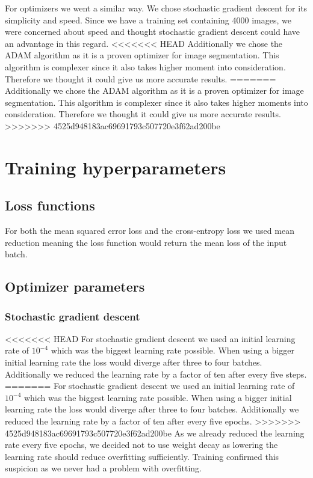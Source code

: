 For optimizers we went a similar way. We chose stochastic gradient descent for its simplicity and speed. Since we have a training set containing 4000 images, we were concerned about speed and thought stochastic gradient descent could have an advantage in this regard.
<<<<<<< HEAD
Additionally we chose the ADAM algorithm as it is a proven optimizer for image segmentation. This algorithm is complexer since it also takes higher moment into consideration.
Therefore we thought it could give us more accurate results.
=======
Additionally we chose the ADAM algorithm as it is a proven optimizer for image segmentation. This algorithm is complexer since it also takes higher moments into consideration.
Therefore we thought it could give us more accurate results. 
>>>>>>> 4525d948183ac69691793c507720e3f62ad200be

\vspace{3 em}
\section{Training hyperparameters}

\subsection{Loss functions}

For both the mean squared error loss and the cross-entropy loss we used mean reduction meaning the loss function would return the mean loss of the input batch.

\subsection{Optimizer parameters}

\subsubsection{Stochastic gradient descent}
<<<<<<< HEAD
For stochastic gradient descent we used an initial learning rate of $10^{-4}$ which was the biggest learning rate possible.
When using a bigger initial learning rate the loss would diverge after three to four batches. Additionally we reduced the learning rate by a factor of ten after every five steps.
=======
For stochastic gradient descent we used an initial learning rate of $10^{-4}$ which was the biggest learning rate possible. 
When using a bigger initial learning rate the loss would diverge after three to four batches. Additionally we reduced the learning rate by a factor of ten after every five epochs.
>>>>>>> 4525d948183ac69691793c507720e3f62ad200be
As we already reduced the learning rate every five epochs, we decided not to use weight decay as lowering the learning rate should reduce overfitting sufficiently.
Training confirmed this suspicion as we never had a problem with overfitting.

